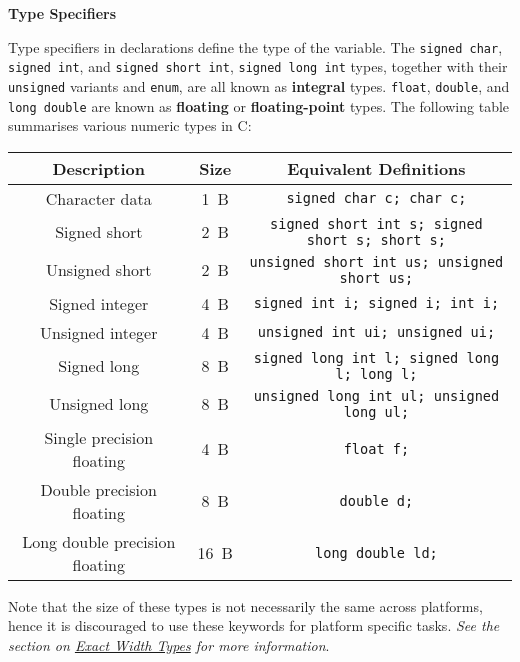 \documentclass{article}
\begin{document}
\vspace{1em}
\textbf{Type Specifiers}
\vspace{1em}

Type specifiers in declarations define the type of the variable. The
\texttt{signed char}, \texttt{signed int}, and
\texttt{signed short int}, \texttt{signed long int}
types, together with their \texttt{unsigned} variants and
\texttt{enum}, are all known as \textbf{integral} types.
\texttt{float}, \texttt{double}, and
\texttt{long double} are known as \textbf{floating} or
\textbf{floating-point}
types. The following table summarises various numeric types in C\@:
\begin{table}[H]
    \centering
    \begin{tabular}{c c c}
        \toprule
        \textbf{Description}           & \textbf{Size} & \textbf{Equivalent Definitions}                              \\
        \midrule
        Character data                 & \qty{1}{B}    & \texttt{signed char c; char c;}                       \\
        Signed short                   & \qty{2}{B}    & \texttt{signed short int s; signed short s; short s;} \\
        Unsigned short                 & \qty{2}{B}    & \texttt{unsigned short int us; unsigned short us;}    \\
        Signed integer                 & \qty{4}{B}    & \texttt{signed int i; signed i; int i;}               \\
        Unsigned integer               & \qty{4}{B}    & \texttt{unsigned int ui; unsigned ui;}                \\
        Signed long                    & \qty{8}{B}    & \texttt{signed long int l; signed long l; long l;}    \\
        Unsigned long                  & \qty{8}{B}    & \texttt{unsigned long int ul; unsigned long ul;}      \\
        Single precision floating      & \qty{4}{B}    & \texttt{float f;}                                     \\
        Double precision floating      & \qty{8}{B}    & \texttt{double d;}                                    \\
        Long double precision floating & \qty{16}{B}   & \texttt{long double ld;}                              \\
        \bottomrule
    \end{tabular}
\end{table}
Note that the size of these types is not necessarily the same across platforms, hence it is discouraged to use these keywords for
platform specific tasks. \emph{See the section on \hyperref[sec:exact_width_types]{Exact Width Types} for more information}.
\end{document}
